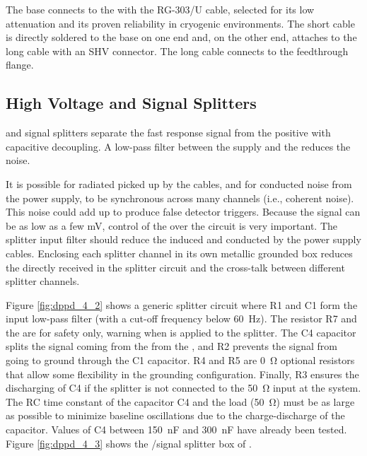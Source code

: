 The  base connects to the \fdth with the RG-303/U cable, selected for its low attenuation and its proven reliability in cryogenic environments. The short cable is directly soldered to the  base on one end and, on the other end, attaches to the long  cable with an SHV connector. The long cable connects to the feedthrough flange.


\subsection{High Voltage and Signal Splitters}
\label{sec:fddp-pd-4.2}

 and signal splitters 
separate the fast  response signal from the positive  with capacitive decoupling. 
A low-pass filter between the  supply and the  reduces the noise.

It is possible for radiated  picked up by the cables, and for conducted noise from the  power supply, to be synchronous across many  channels (i.e., coherent noise). This noise could add up to produce false detector triggers. Because the  signal can be as low as a few \si{mV},
control of the  over the circuit is very important. The splitter  input filter should reduce the  induced and conducted by the power supply cables. Enclosing each splitter channel in its own metallic grounded box reduces the  directly received in the splitter circuit and 
the cross-talk between different splitter channels.

Figure \ref{fig:dppd_4_2} shows a generic splitter circuit where R1 and C1 form the  input low-pass filter (with a cut-off frequency below \SI{60}{Hz}). The resistor R7 and the   are for safety only, warning when  is applied to the splitter. The C4 capacitor splits the signal coming from the  from the , and R2 prevents the  signal from going to ground through the C1 capacitor. R4 and R5 are \SI{0}{\ohm} optional resistors that allow some flexibility in the grounding configuration. Finally, R3 ensures the discharging of C4 if the splitter is not connected to the \SI{50}{\ohm} input at the  system. The RC time constant of the capacitor C4 and the load (\SI{50}{\ohm}) must be as large as possible to minimize baseline oscillations due to the charge-discharge of the capacitor. Values of C4 between \SI{150}{nF} and \SI{300}{nF} have already been tested. Figure \ref{fig:dppd_4_3} shows the /signal splitter box of .

